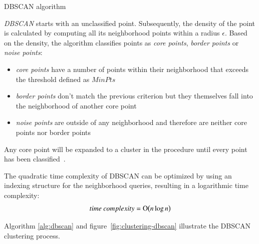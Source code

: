 \begin{algorithm}[h]
  \caption{DBSCAN algorithm~\cite{Meert06clustermaps}}
  \label{alg:dbscan}
\end{algorithm}

\textit{DBSCAN} starts with an unclassified point. Subsequently, the density of the point is calculated by computing all its neighborhood points within a radius $\epsilon$. Based on the density, the algorithm classifies points as \textit{core points}, \textit{border points} or \textit{noise points}:

\begin{itemize}
\item \textit{core points} have a number of points within their neighborhood that exceeds the threshold defined as $MinPts$
\item \textit{border points} don't match the previous criterion but they themselves fall into the neighborhood of another core point
\item \textit{noise points} are outside of any neighborhood and therefore are neither core points nor border points
\end{itemize}

Any core point will be expanded to a cluster in the procedure until every point has been classified~\cite{Varlaro08spatial, Meert06clustermaps}.

The quadratic time complexity of DBSCAN  can be optimized by using an indexing structure for the neighborhood queries, resulting in a logarithmic time complexity:~\cite{wiki:DBSCAN}
\[time~complexity = \operatorname{O}\bigl(n \log{n} \bigr)\]

Algorithm \ref{alg:dbscan} and figure~\ref{fig:clustering-dbscan} illustrate the DBSCAN clustering process.

